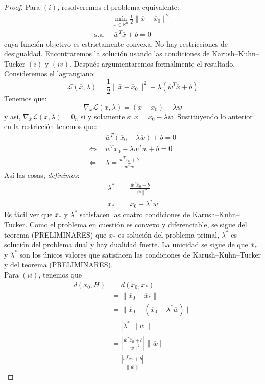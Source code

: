 \documentclass[11pt]{article}
\newcommand{\R}{\mathbb{R}}
\newcommand{\Rn}{\R^{n}}
\newcommand{\wv}{\overline{w}}
\newcommand{\x}{\overline{x}}
\newcommand{\xz}{\overline{x}_{0}}
\newcommand{\z}{\overline{0}_{n}}
\newcommand{\La}{\mathcal{L}}
\newcommand{\xo}{\overline{x}_{*}}
\newcommand{\nw}{\|\wv\|}
\begin{document}
\begin{proof}
Para $(i)$, resolveremos el problema equivalente:
\begin{equation*}
\begin{aligned}
& \underset{\x\in \Rn}{\text{mín}}\ \frac{1}{2} \|\x-\xz\|^{2} \\
\text{s.a.}\ \
& \wv^{T}\x+b=0
\end{aligned}
\end{equation*}
cuya función objetivo es estrictamente convexa. No hay restricciones de desigualdad. Encontraremos la solución usando las condiciones de Karush--Kuhn--Tucker $(i)$ y $(iv)$. Después argumentaremos formalmente el resultado.\\
Consideremos el lagrangiano:
$$\La(\x, \lambda)=\frac{1}{2}\|\x-\xz\|^{2}+\lambda(\wv^{T}\x+b)$$
Tenemos que:
$$\nabla_{\x}\La(\x, \lambda)=(\x-\xz)+\lambda\wv$$
y así, $\nabla_{\x}\La(\x, \lambda)=\z$ si y solamente si $\x=\xz-\lambda\wv$. Sustituyendo lo anterior en la restricción tenemos que:
\begin{equation*}
\begin{aligned}
&\wv^{T}(\xz-\lambda\wv)+b=0 \\
\Leftrightarrow\ \ &\wv^{T}\xz-\lambda\wv^{T}\wv+b=0 \\
\Leftrightarrow\ \ &\lambda=\frac{\wv^{T}\xz+b}{\wv^{T}\wv}
\end{aligned}
\end{equation*}
Así las cosas, \emph{definimos}:
\begin{equation*}
\begin{aligned}
\lambda^{*}&=\frac{\wv^{T}\xz+b}{\nw^{2}}\\
\xo&=\xz-\lambda^{*}\wv
\end{aligned}
\end{equation*}
Es fácil ver que $\xo$ y $\lambda^{*}$ satisfacen las cuatro condiciones de Karush--Kuhn--Tucker. Como el problema en cuestión es convexo y diferenciable, se sigue del teorema (PRELIMINARES) que $\xo$ es solución del problema primal, $\lambda^{*}$ es solución del problema dual y hay dualidad fuerte. La unicidad se sigue de que $\xo$ y $\lambda^{*}$ son los únicos valores que satisfacen las condiciones de Karush--Kuhn--Tucker y del teorema (PRELIMINARES).\\
Para $(ii)$, tenemos que
\begin{equation*}
\begin{aligned}
d(\xz, H)&=d(\xz, \xo) \\%
&=\|\xz-\xo\| \\%
&=\|\xz-(\xz-\lambda^{*}\wv)\| \\%
&=|\lambda^{*}|\nw \\
&=\left|\frac{\wv^{T}\xz+b}{\nw^{2}}\right| \nw\\
&=\frac{|\wv^{T}\xz+b|}{\nw}
\end{aligned}
\end{equation*} 
\end{proof}
\end{document}
